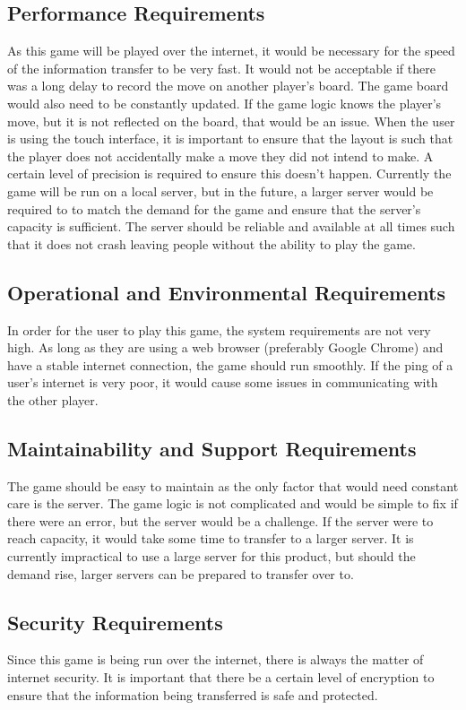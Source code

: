\documentclass[12pt, titlepage]{article}
\begin{document}
\subsection{Performance Requirements}
As this game will be played over the internet, it would be necessary for the speed of the information transfer to be very fast. It would not be acceptable if there was a long delay to record the move on another player’s board. The game board would also need to be constantly updated. If the game logic knows the player’s move, but it is not reflected on the board, that would be an issue. When the user is using the touch interface, it is important to ensure that the layout is such that the player does not accidentally make a move they did not intend to make. A certain level of precision is required to ensure this doesn’t happen. Currently the game will be run on a local server, but in the future, a larger server would be required to to match the demand for the game and ensure that the server’s capacity is sufficient. The server should be reliable and available at all times such that it does not crash leaving people without the ability to play the game.
\subsection{Operational and Environmental Requirements}
In order for the user to play this game, the system requirements are not very high. As long as they are using a web browser (preferably Google Chrome) and have a stable internet connection, the game should run smoothly. If the ping of a user’s internet is very poor, it would cause some issues in communicating with the other player.
\subsection{Maintainability and Support Requirements}
The game should be easy to maintain as the only factor that would need constant care is the server. The game logic is not complicated and would be simple to fix if there were an error, but the server would be a challenge. If the server were to reach capacity, it would take some time to transfer to a larger server. It is currently impractical to use a large server for this product, but should the demand rise, larger servers can be prepared to transfer over to.
\subsection{Security Requirements}
Since this game is being run over the internet, there is always the matter of internet security. It is important that there be a certain level of encryption to ensure that the information being transferred is safe and protected. 
\end{document}
